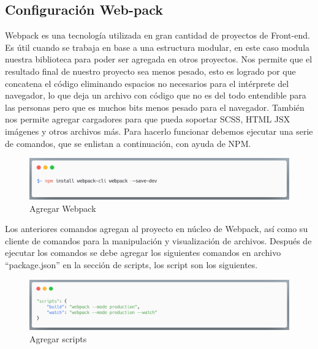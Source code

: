     \subsection{Configuración Web-pack}
    Webpack es una tecnología utilizada en gran cantidad de proyectos de Front-end. Es útil cuando se trabaja en base a una estructura modular, en este caso modula nuestra biblioteca para poder ser agregada en otros proyectos. Nos permite que el resultado final de nuestro proyecto sea menos pesado, esto es logrado por que concatena el código eliminando espacios no necesarios para el intérprete del navegador, lo que deja un archivo con código que no es del todo entendible para las personas pero que es muchos bits menos pesado para el navegador.
    También nos permite agregar cargadores para que pueda soportar SCSS, HTML JSX imágenes y otros archivos más.
    Para hacerlo funcionar debemos ejecutar una serie de comandos, que se enlistan a continuación, con ayuda de NPM.
    \newline
    \newline
     \begin{figure}[H]
    \includegraphics[width=1\textwidth]{./Imagenes/image3.png}
     \caption[Agregar Webpack]{Agregar Webpack}
         \end{figure}
    \newline
    \newline
    Los anteriores comandos agregan al proyecto en núcleo de Webpack, así como su cliente de comandos para la manipulación y visualización de archivos. Después de ejecutar los comandos se debe agregar los siguientes comandos en archivo “package.json”  en la sección de scripts, los script son los siguientes.
    \newline
    \newline
     \begin{figure}[H]
    \includegraphics[width=1\textwidth]{./Imagenes/image6.png}
     \caption[Agregar scripts]{Agregar scripts}
         \end{figure}
